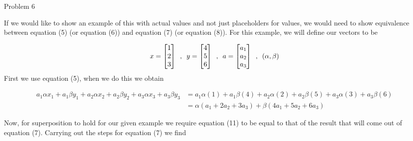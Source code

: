\begin{problem}{Problem 6}
\begin{Highlight}
        If we would like to show an example of this with actual values and not just placeholders for values, we would need to show equivalence between equation (5) (or equation (6)) and equation (7) 
        (or equation (8)). For this example, we will define our vectors to be 

        \begin{equation}
            x =
            \begin{bmatrix}
                1 \\
                2 \\
                3 \\
            \end{bmatrix}
            \hspace*{5pt} , \hspace*{5pt}
            y = 
            \begin{bmatrix}
                4 \\
                5 \\
                6 \\
            \end{bmatrix}
            \hspace*{5pt} , \hspace*{5pt}
            a = 
            \begin{bmatrix}
                a_{1} \\
                a_{2} \\
                a_{3} \\
            \end{bmatrix}
            \hspace*{5pt} , \hspace*{5pt} 
            (\alpha , \beta)
        \end{equation}
        First we use equation (5), when we do this we obtain

        \footnotesize
        \begin{align}
            a_{1} \alpha x_{1} + a_{1} \beta y_{1} + a_{2} \alpha x_{2} + a_{2} \beta y_{2} + a_{3} \alpha x_{3} + a_{3} \beta y_{3} & = a_{1} \alpha (1) + a_{1} \beta (4) + a_{2} \alpha (2) + a_{2} \beta (5) + a_{3} \alpha (3) + a_{3} \beta (6) \\
            & = \alpha (a_{1} + 2a_{2} + 3a_{3}) + \beta (4a_{1} + 5a_{2} + 6a_{3}) 
        \end{align}

        Now, for superposition to hold for our given example we require equation (11) to be equal to that of the result that will come out of equation (7). Carrying out the steps for equation (7)
        we find


\end{Highlight}
\end{problem}
